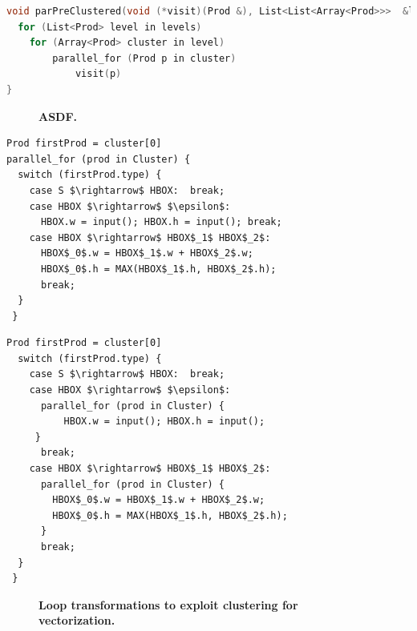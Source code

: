 \newsavebox{\bfsClusteredVisitor}
\begin{lrbox}{\bfsClusteredVisitor}%
\begin{lstlisting}[mathescape,language=C++,morekeywords={spawn,join,reverse,parallel_for}]
void parPreClustered(void (*visit)(Prod &), List<List<Array<Prod>>>  &levels) {
  for (List<Prod> level in levels)
  	for (Array<Prod> cluster in level)
  		parallel_for (Prod p in cluster)
			visit(p)
}
\end{lstlisting}
\end{lrbox}

\begin{figure}
 \usebox{\bfsClusteredVisitor}  
\caption{\textbf{ASDF.}}
\label{fig:clusteredeval}
\end{figure}


\newsavebox{\clusterUnswitchA}
\begin{lrbox}{\clusterUnswitchA}%
\begin{lstlisting}[mathescape]
Prod firstProd = cluster[0]
parallel_for (prod in Cluster) {
  switch (firstProd.type) {
    case S $\rightarrow$ HBOX:  break;
    case HBOX $\rightarrow$ $\epsilon$:
      HBOX.w = input(); HBOX.h = input(); break;
    case HBOX $\rightarrow$ HBOX$_1$ HBOX$_2$:
      HBOX$_0$.w = HBOX$_1$.w + HBOX$_2$.w;
      HBOX$_0$.h = MAX(HBOX$_1$.h, HBOX$_2$.h);
      break;
  }
 }
\end{lstlisting}
\end{lrbox}

\newsavebox{\clusterUnswitchB}
\begin{lrbox}{\clusterUnswitchB}%
\begin{lstlisting}[mathescape]
Prod firstProd = cluster[0]
  switch (firstProd.type) {
    case S $\rightarrow$ HBOX:  break;
    case HBOX $\rightarrow$ $\epsilon$:
      parallel_for (prod in Cluster) {
          HBOX.w = input(); HBOX.h = input();
     }
      break;
    case HBOX $\rightarrow$ HBOX$_1$ HBOX$_2$:
      parallel_for (prod in Cluster) {
        HBOX$_0$.w = HBOX$_1$.w + HBOX$_2$.w;
        HBOX$_0$.h = MAX(HBOX$_1$.h, HBOX$_2$.h);
      }
      break;
  }
 }
\end{lstlisting}
\end{lrbox}



\begin{figure}
\caption{\textbf{Loop transformations to exploit clustering for vectorization.}}
\label{fig:clusteringunswitching}
\end{figure}


